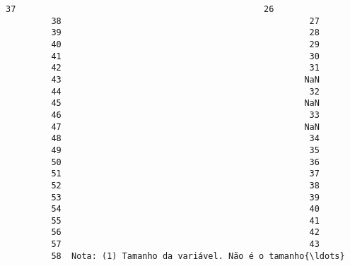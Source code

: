 \documentclass[11pt]{article}
\begin{document}
\begin{Verbatim}[commandchars=\\\{\}]
         37                                                 26   
         38                                                 27   
         39                                                 28   
         40                                                 29   
         41                                                 30   
         42                                                 31   
         43                                                NaN   
         44                                                 32   
         45                                                NaN   
         46                                                 33   
         47                                                NaN   
         48                                                 34   
         49                                                 35   
         50                                                 36   
         51                                                 37   
         52                                                 38   
         53                                                 39   
         54                                                 40   
         55                                                 41   
         56                                                 42   
         57                                                 43   
         58  Nota: (1) Tamanho da variável. Não é o tamanho{\ldots}   
         

\end{Verbatim}
\end{document}
